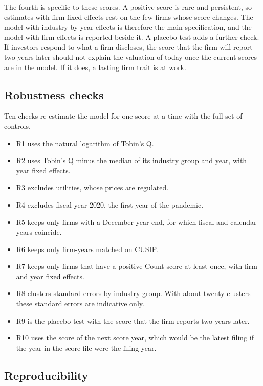 \documentclass[12pt,a4paper]{article}
\begin{document}
The fourth is specific to these scores. A positive score is rare and persistent, so estimates with firm fixed effects rest on the few firms whose score changes. The model with industry-by-year effects is therefore the main specification, and the model with firm effects is reported beside it. A placebo test adds a further check. If investors respond to what a firm discloses, the score that the firm will report two years later should not explain the valuation of today once the current scores are in the model. If it does, a lasting firm trait is at work.

\subsection{Robustness checks}

Ten checks re-estimate the model for one score at a time with the full set of controls.

\begin{itemize}
\item R1 uses the natural logarithm of Tobin's Q.
\item R2 uses Tobin's Q minus the median of its industry group and year, with year fixed effects.
\item R3 excludes utilities, whose prices are regulated.
\item R4 excludes fiscal year 2020, the first year of the pandemic.
\item R5 keeps only firms with a December year end, for which fiscal and calendar years coincide.
\item R6 keeps only firm-years matched on CUSIP.
\item R7 keeps only firms that have a positive Count score at least once, with firm and year fixed effects.
\item R8 clusters standard errors by industry group. With about twenty clusters these standard errors are indicative only.
\item R9 is the placebo test with the score that the firm reports two years later.
\item R10 uses the score of the next score year, which would be the latest filing if the year in the score file were the filing year.
\end{itemize}

\subsection{Reproducibility}
\end{document}
